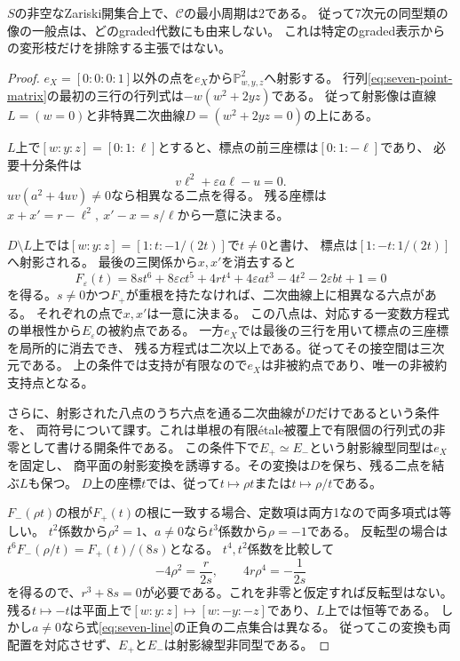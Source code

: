 \begin{theorem}[一般のファイバーは最小周期2]\label{thm:seven-period-two}
$S$の非空なZariski開集合上で、$\mathcal C$の最小周期は2である。
従って7次元の同型類の像の一般点は、どのgraded代数にも由来しない。
これは特定のgraded表示からの変形枝だけを排除する主張ではない。
\end{theorem}
\begin{proof}
$e_X=[0:0:0:1]$以外の点を$e_X$から$\mathbb P^2_{w,y,z}$へ射影する。
行列\eqref{eq:seven-point-matrix}の最初の三行の行列式は$-w(w^2+2yz)$である。
従って射影像は直線$L=(w=0)$と非特異二次曲線$D=(w^2+2yz=0)$の上にある。

$L$上で$[w:y:z]=[0:1:\ell]$とすると、標点の前三座標は$[0:1:-\ell]$であり、
必要十分条件は
\begin{equation}\label{eq:seven-line}
 v\ell^2+\varepsilon a\ell-u=0.
\end{equation}
$uv(a^2+4uv)\ne0$なら相異なる二点を得る。
残る座標は$x+x'=r-\ell^2,\ x'-x=s/\ell$から一意に決まる。

$D\setminus L$上では$[w:y:z]=[1:t:-1/(2t)]$で$t\ne0$と書け、
標点は$[1:-t:1/(2t)]$へ射影される。
最後の三関係から$x,x'$を消去すると
\begin{equation}\label{eq:seven-sextic}
 F_\varepsilon(t)=8st^6+8\varepsilon ct^5+4rt^4+4\varepsilon at^3
                   -4t^2-2\varepsilon bt+1=0
\end{equation}
を得る。$s\ne0$かつ$F_+$が重根を持たなければ、二次曲線上に相異なる六点がある。
それぞれの点で$x,x'$は一意に決まる。
この八点は、対応する一変数方程式の単根性から$E_\varepsilon$の被約点である。
一方$e_X$では最後の三行を用いて標点の三座標を局所的に消去でき、
残る方程式は二次以上である。従ってその接空間は三次元である。
上の条件では支持が有限なので$e_X$は非被約点であり、唯一の非被約支持点となる。

さらに、射影された八点のうち六点を通る二次曲線が$D$だけであるという条件を、
両符号について課す。これは単根の有限\'etale被覆上で有限個の行列式の非零として書ける開条件である。
この条件下で$E_+\simeq E_-$という射影線型同型は$e_X$を固定し、
商平面の射影変換を誘導する。その変換は$D$を保ち、残る二点を結ぶ$L$も保つ。
$D$上の座標$t$では、従って$t\mapsto\rho t$または$t\mapsto\rho/t$である。

$F_-(\rho t)$の根が$F_+(t)$の根に一致する場合、定数項は両方1なので両多項式は等しい。
$t^2$係数から$\rho^2=1$、$a\ne0$なら$t^3$係数から$\rho=-1$である。
反転型の場合は$t^6F_-(\rho/t)=F_+(t)/(8s)$となる。
$t^4,t^2$係数を比較して
\[
 -4\rho^2=\frac{r}{2s},\qquad 4r\rho^4=-\frac1{2s}
\]
を得るので、$r^3+8s=0$が必要である。これを非零と仮定すれば反転型はない。
残る$t\mapsto-t$は平面上で$[w:y:z]\mapsto[w:-y:-z]$であり、$L$上では恒等である。
しかし$a\ne0$なら式\eqref{eq:seven-line}の正負の二点集合は異なる。
従ってこの変換も両配置を対応させず、$E_+$と$E_-$は射影線型非同型である。


\end{proof}
